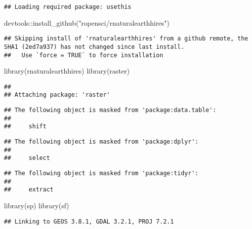 \documentclass[
]{article}
\newenvironment{Shaded}{\begin{snugshade}}{\end{snugshade}}
\newcommand{\FunctionTok}[1]{\textcolor[rgb]{0.00,0.00,0.00}{#1}}
\newcommand{\NormalTok}[1]{#1}
\newcommand{\SpecialCharTok}[1]{\textcolor[rgb]{0.00,0.00,0.00}{#1}}
\newcommand{\StringTok}[1]{\textcolor[rgb]{0.31,0.60,0.02}{#1}}
\begin{document}
\begin{verbatim}
## Loading required package: usethis
\end{verbatim}

\begin{Shaded}
\begin{Highlighting}[]
\NormalTok{devtools}\SpecialCharTok{::}\FunctionTok{install\_github}\NormalTok{(}\StringTok{"ropensci/rnaturalearthhires"}\NormalTok{)}
\end{Highlighting}
\end{Shaded}

\begin{verbatim}
## Skipping install of 'rnaturalearthhires' from a github remote, the SHA1 (2ed7a937) has not changed since last install.
##   Use `force = TRUE` to force installation
\end{verbatim}

\begin{Shaded}
\begin{Highlighting}[]
\FunctionTok{library}\NormalTok{(rnaturalearthhires)}
\FunctionTok{library}\NormalTok{(raster)}
\end{Highlighting}
\end{Shaded}

\begin{verbatim}
## 
## Attaching package: 'raster'
\end{verbatim}

\begin{verbatim}
## The following object is masked from 'package:data.table':
## 
##     shift
\end{verbatim}

\begin{verbatim}
## The following object is masked from 'package:dplyr':
## 
##     select
\end{verbatim}

\begin{verbatim}
## The following object is masked from 'package:tidyr':
## 
##     extract
\end{verbatim}

\begin{Shaded}
\begin{Highlighting}[]
\FunctionTok{library}\NormalTok{(sp)}
\FunctionTok{library}\NormalTok{(sf)}
\end{Highlighting}
\end{Shaded}

\begin{verbatim}
## Linking to GEOS 3.8.1, GDAL 3.2.1, PROJ 7.2.1
\end{verbatim}
\end{document}
